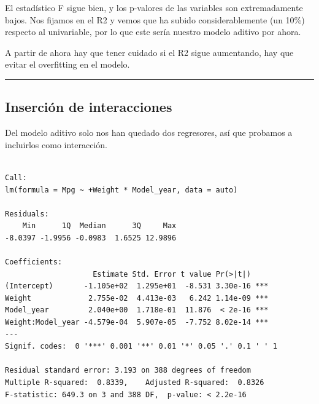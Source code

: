 \documentclass[
]{article}
\newenvironment{Shaded}{\begin{snugshade}}{\end{snugshade}}
\newcommand{\DataTypeTok}[1]{\textcolor[rgb]{0.13,0.29,0.53}{#1}}
\newcommand{\KeywordTok}[1]{\textcolor[rgb]{0.13,0.29,0.53}{\textbf{#1}}}
\newcommand{\NormalTok}[1]{#1}
\newcommand{\OperatorTok}[1]{\textcolor[rgb]{0.81,0.36,0.00}{\textbf{#1}}}
\newcommand{\StringTok}[1]{\textcolor[rgb]{0.31,0.60,0.02}{#1}}
\begin{document}
El estadístico F sigue bien, y los p-valores de las variables son
extremadamente bajos. Nos fijamos en el R2 y vemos que ha subido
considerablemente (un 10\%) respecto al univariable, por lo que este
sería nuestro modelo aditivo por ahora.

A partir de ahora hay que tener cuidado si el R2 sigue aumentando, hay
que evitar el overfitting en el modelo.

\begin{center}\rule{0.5\linewidth}{0.5pt}\end{center}

\hypertarget{inserciuxf3n-de-interacciones}{%
\subsection{Inserción de
interacciones}\label{inserciuxf3n-de-interacciones}}

Del modelo aditivo solo nos han quedado dos regresores, así que probamos
a incluirlos como interacción.

\begin{Shaded}
\end{Shaded}

\begin{verbatim}

Call:
lm(formula = Mpg ~ +Weight * Model_year, data = auto)

Residuals:
    Min      1Q  Median      3Q     Max 
-8.0397 -1.9956 -0.0983  1.6525 12.9896 

Coefficients:
                    Estimate Std. Error t value Pr(>|t|)    
(Intercept)       -1.105e+02  1.295e+01  -8.531 3.30e-16 ***
Weight             2.755e-02  4.413e-03   6.242 1.14e-09 ***
Model_year         2.040e+00  1.718e-01  11.876  < 2e-16 ***
Weight:Model_year -4.579e-04  5.907e-05  -7.752 8.02e-14 ***
---
Signif. codes:  0 '***' 0.001 '**' 0.01 '*' 0.05 '.' 0.1 ' ' 1

Residual standard error: 3.193 on 388 degrees of freedom
Multiple R-squared:  0.8339,    Adjusted R-squared:  0.8326 
F-statistic: 649.3 on 3 and 388 DF,  p-value: < 2.2e-16
\end{verbatim}
\end{document}
